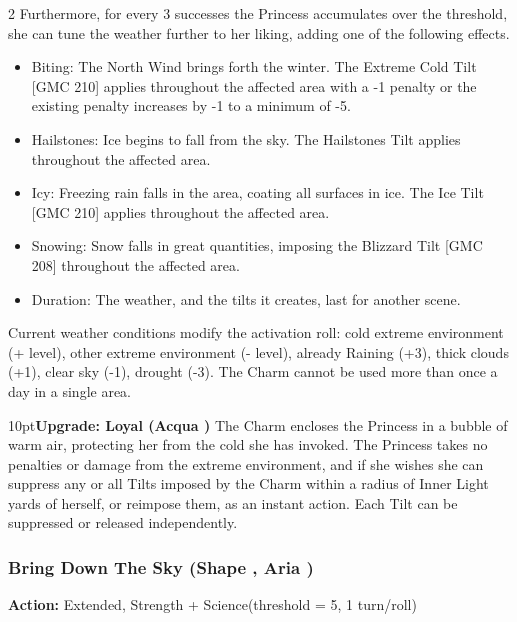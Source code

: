 \begin{multicols}{2}
Furthermore, for every 3 successes the Princess accumulates over the threshold, she can tune the weather further to her liking, adding one of the following effects.

\begin{itemize}
    \item Biting: The North Wind brings forth the winter. The Extreme Cold Tilt [GMC 210] applies throughout the affected area with a -1 penalty or the existing penalty increases by -1 to a minimum of -5.
    \item Hailstones: Ice begins to fall from the sky. The Hailstones Tilt applies throughout the affected area. 
    \item Icy: Freezing rain falls in the area, coating all surfaces in ice. The Ice Tilt [GMC 210] applies throughout the affected area.
    \item Snowing: Snow falls in great quantities, imposing the Blizzard Tilt [GMC 208] throughout the affected area.
    \item Duration: The weather, and the tilts it creates, last for another scene.\end{itemize}
                                                                            
 
Current weather conditions modify the activation roll: cold extreme environment (+ level), other extreme environment (- level), already Raining (+3), thick clouds (+1), clear sky (-1), drought (-3). The Charm cannot be used more
than once a day in a single area.

\begin{myindentpar}{10pt}\textbf{Upgrade: Loyal (Acqua \textbullet\textbullet\textbullet\textbullet)}
The Charm encloses the Princess in a bubble of warm air, protecting her from the cold she has invoked. The Princess takes no penalties or damage from the extreme environment, and if she wishes she can suppress any or all Tilts imposed by the Charm within a radius of Inner Light yards of herself, or reimpose them, as an instant action. Each Tilt can be suppressed or released independently.\end{myindentpar}

\subsubsection*{Bring Down The Sky (Shape \textbullet\textbullet\textbullet\textbullet, Aria \textbullet\textbullet\textbullet)}

\noindent \textbf{Action:} Extended, Strength + Science(threshold = 5, 1 turn/roll)


\end{multicols}
